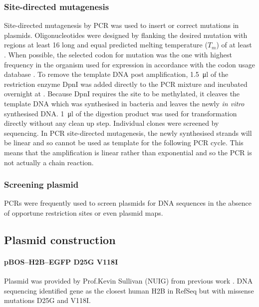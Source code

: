       \subsubsection{Site-directed mutagenesis}
        Site-directed mutagenesis by PCR was used to insert or correct
        mutations in plasmids.
        Oligonucleotides were designed by flanking the
        desired mutation with regions at least \SI{16}{\bp} long
        and equal predicted melting temperature ($T_m$) of at least .
        When possible, the selected codon for mutation was the one
        with highest frequency in the organism used for expression
        in accordance with the
        codon usage database \citep{codon_usage}.
        To remove the template DNA post amplification, \SI{1.5}{\ul} of the
        restriction enzyme DpnI was added directly to the PCR mixture
        and incubated overnight at .
        Because DpnI requires the site to be methylated, it
        cleaves the template DNA which was synthesised in
        bacteria and leaves the newly \textit{in vitro}
        synthesised DNA.
        \SI{1}{\ul} of the digestion product was used for
        transformation directly without any clean up step.
        Individual clones were screened by sequencing.
        In PCR site-directed mutagenesis, the newly synthesised
        strands will be linear and so cannot be used as template for
        the following PCR cycle.
        This means that the amplification is linear rather than
        exponential and so the PCR is not actually a chain reaction.

      \subsubsection{Screening plasmid}
        PCRs were frequently used to screen plasmids for DNA sequences
        in the absence of opportune restriction sites or even plasmid maps.

    \subsection{Plasmid construction}
      \label{sec:plasmid-construction}

      \paragraph{pBOS--H2B--EGFP D25G V118I}
      Plasmid was provided by Prof.\@ Kevin Sullivan (NUIG) from
      previous work \citep{KevinH2BGFP}.  DNA sequencing identified
      gene  as the closest human H2B in RefSeq but
      with missense mutations D25G and V118I.

